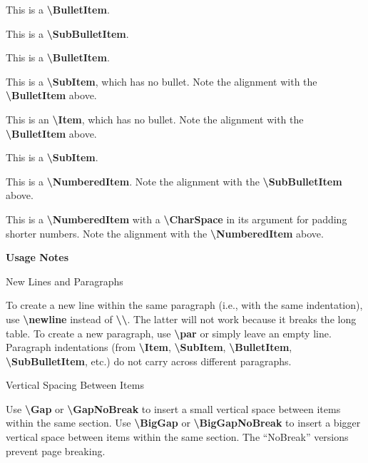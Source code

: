 \documentclass[letterpaper,MMMyyyy,nonstop]{simpleresumecv}
\newcommand{\CodeCommand}[1]{\mbox{\textbf{\textbackslash{#1}}}}
\begin{document}
\begin{body}
\GapNoBreak
\BulletItem
This is a \CodeCommand{BulletItem}.
\begin{detail}
\SubBulletItem
This is a \CodeCommand{SubBulletItem}.
\end{detail}

\GapNoBreak
\BulletItem
This is a \CodeCommand{BulletItem}.
\begin{detail}
\SubItem
This is a \CodeCommand{SubItem}, which has no bullet.
Note the alignment with the \CodeCommand{BulletItem} above.
\end{detail}

\GapNoBreak
\Item
This is an \CodeCommand{Item}, which has no bullet.
Note the alignment with the \CodeCommand{BulletItem} above.
\begin{detail}
\SubItem
This is a \CodeCommand{SubItem}.
\end{detail}

\GapNoBreak
\NumberedItem{[16]}
This is a \CodeCommand{NumberedItem}.
Note the alignment with the \CodeCommand{SubBulletItem} above.

\GapNoBreak
\NumberedItem{{\CharSpace}[6]}
This is a \CodeCommand{NumberedItem} with a \CodeCommand{CharSpace} in its argument for padding shorter numbers.
Note the alignment with the \CodeCommand{NumberedItem} above.

\BigGap
\textbf{Usage Notes}

\GapNoBreak
\BulletItem
New Lines and Paragraphs
\begin{detail}
\SubBulletItem
To create a new line within the same paragraph (i.e., with the same indentation), use \CodeCommand{newline} instead of \CodeCommand{\textbackslash}.
The latter will not work because it breaks the long table.
\SubBulletItem
To create a new paragraph, use \CodeCommand{par} or simply leave an empty line.
Paragraph indentations (from
\CodeCommand{Item},
\CodeCommand{SubItem},
\CodeCommand{BulletItem},
\CodeCommand{SubBulletItem},
etc.) do not carry across different paragraphs.
\end{detail}

\Gap
\BulletItem
Vertical Spacing Between Items
\begin{detail}
\SubBulletItem
Use \CodeCommand{Gap} or \CodeCommand{GapNoBreak} to insert a small vertical space between items within the same section.
\SubBulletItem
Use \CodeCommand{BigGap} or \CodeCommand{BigGapNoBreak} to insert a bigger vertical space between items within the same section.
\SubBulletItem
The ``NoBreak'' versions prevent page breaking.
\end{detail}


\end{body}
\end{document}
